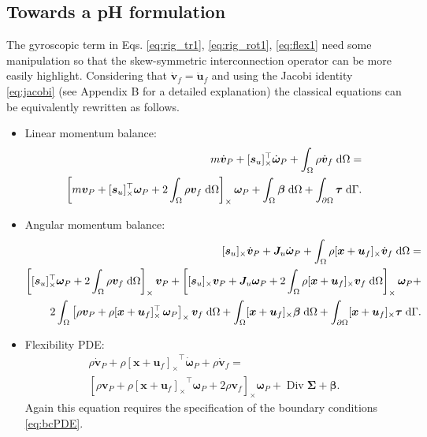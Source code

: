 \documentclass{svjour3}                     %
\DeclareMathOperator*{\Div}{Div}
\newcommand{\crmat}[1]{\ensuremath{[#1]_{\times}}}
\begin{document}
\subsection{Towards a pH formulation}
The gyroscopic term in Eqs. \eqref{eq:rig_tr1}, \eqref{eq:rig_rot1}, \eqref{eq:flex1} need some manipulation so that the skew-symmetric interconnection operator can be more easily highlight. Considering that $\dot{\bm{v}}_f = \ddot{\bm{u}}_f$ and using the Jacobi identity \eqref{eq:jacobi} (see Appendix B for a detailed explanation) the classical equations can be equivalently rewritten as follows. \\
\begin{itemize}
\item Linear momentum balance:
\begin{equation}
\label{eq:rig_tr2}
\begin{split}
m\dot{\bm{v}}_P + \crmat{\bm{s}_u}^\top \dot{\bm{\omega}}_P +   \int_{\Omega} \rho \dot{\bm{v}}_f \d{\Omega}  = \\
\left[m \bm{v}_P + \crmat{\bm{s}_u}^\top \bm\omega_P +2 \int_{\Omega} \rho \bm{v}_f \d{\Omega} \right]_\times \bm\omega_P +  \int_{\Omega} \bm\beta \d{\Omega} + \int_{\partial \Omega} \bm\tau \d{\Gamma}.
\end{split}
\end{equation}
\item Angular momentum balance:
\begin{equation}
\label{eq:rig_rot2}
\begin{split}
\crmat{\bm{s}_u} \dot{\bm{v}}_P  + \bm{J}_u \dot{\bm\omega}_P + \int_{\Omega} \rho \crmat{\bm{x}+\bm{u}_f} \dot{\bm{v}}_f \d{\Omega} = \\
\left[\crmat{\bm{s}_u}^\top \bm\omega_P + 2 \int_{\Omega} \rho \bm{v}_f \d{\Omega} \right]_\times \bm{v}_P + \left[\crmat{\bm{s}_u} \bm{v}_P + \bm{J}_u \bm\omega_P + 2 \int_{\Omega} \rho \crmat{\bm{x}+\bm{u}_f} {\bm{v}}_f \d{\Omega} \right]_\times \bm\omega_P + 
\\
2 \int_{\Omega} \left[\rho \bm{v}_P + \rho \crmat{\bm{x}+\bm{u}_f}^\top \, \bm\omega_P \right]_\times \bm{v}_f \d{\Omega} + \int_{\Omega}\crmat{\bm{x}+\bm{u}_f} \bm\beta \d{\Omega} + \int_{\partial \Omega}\crmat{\bm{x}+\bm{u}_f} \bm{\tau} \d{\Gamma}.
\end{split}
\end{equation}
\item Flexibility PDE:
\begin{equation}
\label{eq:flex2}
\begin{split}
\rho \dot{\bm{v}}_P + \rho \crmat{\bm{x}+\bm{u}_f}^\top \dot{\bm\omega}_P  + \rho \dot{\bm{v}}_f = \\
\left[\rho \bm{v}_P + \rho \crmat{\bm{x}+\bm{u}_f}^\top \bm\omega_P + 2 \rho \bm{v}_f \right]_\times \bm\omega_P + \Div{\bm\Sigma} + \bm\beta.
\end{split}
\end{equation}
Again this equation requires the specification of the boundary conditions \eqref{eq:bcPDE}.
\end{itemize}
\end{document}
